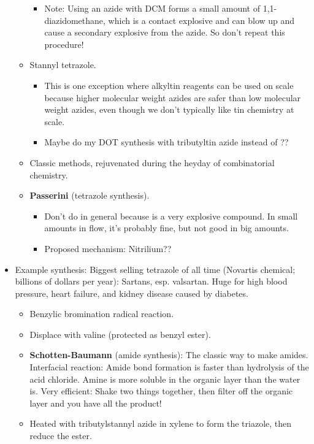 \documentclass[../notes.tex]{subfiles}
\begin{document}
\begin{itemize}
\begin{itemize}
        \begin{itemize}
            \item Note: Using an azide with DCM forms a small amount of 1,1-diazidomethane, which is a contact explosive and can blow up and cause a secondary explosive from the azide. So don't repeat this procedure!
        \end{itemize}
        \item Stannyl tetrazole.
        \begin{itemize}
            \item This is one exception where alkyltin reagents can be used on scale because higher molecular weight azides are safer than low molecular weight azides, even though we don't typically like tin chemistry at scale.
            \item Maybe do my DOT synthesis with tributyltin azide instead of ??
        \end{itemize}
        \item Classic methods, rejuvenated during the heyday of combinatorial chemistry.
        \item \textbf{Passerini} (tetrazole synthesis).
        \begin{itemize}
            \item Don't do in general because  is a very explosive compound. In small amounts in flow, it's probably fine, but not good in big amounts.
            \item Proposed mechanism: Nitrilium??
        \end{itemize}
    \end{itemize}
    \item Example synthesis: Biggest selling tetrazole of all time (Novartis chemical; billions of dollars per year): Sartans, esp. valsartan. Huge for high blood pressure, heart failure, and kidney disease caused by diabetes.
    \begin{itemize}
        \item Benzylic bromination radical reaction.
        \item Displace with valine (protected as benzyl ester).
        \item \textbf{Schotten-Baumann} (amide synthesis): The classic way to make amides. Interfacial reaction: Amide bond formation is faster than hydrolysis of the acid chloride. Amine is more soluble in the organic layer than the water is. Very efficient: Shake two things together, then filter off the organic layer and you have all the product!
        \item Heated with tributylstannyl azide in xylene to form the triazole, then reduce the ester.

\end{itemize}
\end{itemize}
\end{document}
